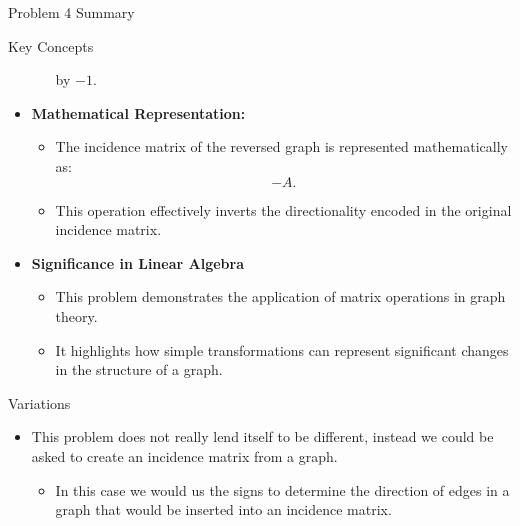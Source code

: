 \begin{summary}{Problem 4 Summary}
\begin{statement}{Key Concepts}
\begin{itemize}
\begin{itemize}
                by $-1$.
            \end{itemize}
            \item \textbf{Mathematical Representation:}
            \begin{itemize}
                \item The incidence matrix of the reversed graph is represented mathematically as:
                \begin{equation*}
                    -A.
                \end{equation*}
                \item This operation effectively inverts the directionality encoded in the original incidence matrix.
            \end{itemize}
            \item \textbf{Significance in Linear Algebra}
            \begin{itemize}
                \item This problem demonstrates the application of matrix operations in graph theory.
                \item It highlights how simple transformations can represent significant changes in the structure of a graph.
            \end{itemize}
        \end{itemize}
    \end{statement}
    \begin{statement}{Variations}
        \begin{itemize}
            \item This problem does not really lend itself to be different, instead we could be asked to create an incidence matrix from a graph.
            \begin{itemize}
                \item In this case we would us the signs to determine the direction of edges in a graph that would be inserted into an incidence matrix.
            \end{itemize}
        \end{itemize}
    \end{statement}
\end{summary}


